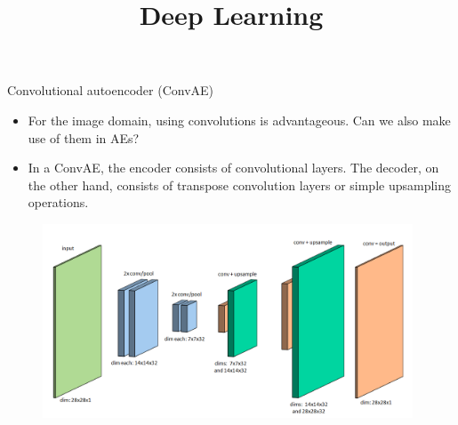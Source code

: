 




\title{Deep Learning}
\date{}


\newcommand{\titlefigure}{plots/image-compression.png}
\newcommand{\learninggoals}{
  \item convolutional AEs
  \item applications of AEs 
}





\begin{vbframe}{Convolutional autoencoder (ConvAE)}
  \begin{itemize}
    \item %
    For the image domain, using convolutions is advantageous. Can we also make use of them in AEs?     
    \item In a ConvAE, the encoder consists of convolutional layers. The decoder, on the other hand, consists of transpose convolution layers or simple upsampling operations.
  \end{itemize}
\framebreak
  \begin{figure}
    \centering
    \includegraphics[width=11cm]{plots/convolutional_autoencoder3.png}

\end{figure}
\end{vbframe}
